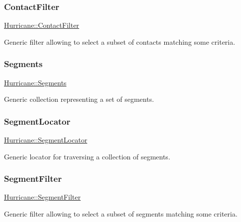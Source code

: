 \subsubsection{\texorpdfstring{Contact\+Filter}{ContactFilter}}
{\footnotesize\ttfamily \mbox{\hyperlink{namespaceHurricane_a57f79232601d8739370debec00f89740}{Hurricane\+::\+Contact\+Filter}}}

Generic filter allowing to select a subset of contacts matching some criteria. \mbox{\label{namespaceHurricane_a30748fa53a81cb597d4a13d651238716}} 
\subsubsection{\texorpdfstring{Segments}{Segments}}
{\footnotesize\ttfamily \mbox{\hyperlink{namespaceHurricane_a30748fa53a81cb597d4a13d651238716}{Hurricane\+::\+Segments}}}

Generic collection representing a set of segments. \mbox{\label{namespaceHurricane_a37c8302c278e8c1c60c6ffc0222ec4c8}} 
\subsubsection{\texorpdfstring{Segment\+Locator}{SegmentLocator}}
{\footnotesize\ttfamily \mbox{\hyperlink{namespaceHurricane_a37c8302c278e8c1c60c6ffc0222ec4c8}{Hurricane\+::\+Segment\+Locator}}}

Generic locator for traversing a collection of segments. \mbox{\label{namespaceHurricane_a891c4a2d614e158d183dada8b0ab1747}} 
\subsubsection{\texorpdfstring{Segment\+Filter}{SegmentFilter}}
{\footnotesize\ttfamily \mbox{\hyperlink{namespaceHurricane_a891c4a2d614e158d183dada8b0ab1747}{Hurricane\+::\+Segment\+Filter}}}

Generic filter allowing to select a subset of segments matching some criteria. \mbox{\label{namespaceHurricane_a146e2d3d34b4035aff422f12e85345b9}} 
